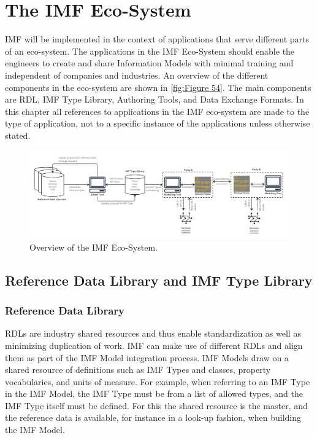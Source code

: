 \chapter{The IMF Eco-System }
\label{ch:Chapter 7}
IMF will be implemented in the context of applications that serve
different parts of an eco-system. The applications in the IMF Eco-System should enable the engineers to create and
share Information Models with minimal training and independent of companies and industries. An overview of the
different components in the eco-system are shown in \autoref{fig:Figure 54}. The main components are RDL, IMF Type Library,
Authoring Tools, and Data Exchange Formats. In this chapter all references to applications in the IMF eco-system are
made to the type of application, not to a specific instance of the applications unless otherwise stated.


\begin{figure}[htb]
  \includegraphics[width=1\textwidth]{img/IMFmanual-img072.jpg}
  \caption{Overview of the IMF Eco-System.}
  \label{fig:Figure 54}
\end{figure}

\section{Reference Data Library and IMF Type Library}
\subsection{Reference Data Library}
RDLs are industry shared resources and thus enable standardization as well as minimizing
duplication of work. IMF can make use of different RDLs and align them as part of the IMF Model integration process.
IMF Models draw on a shared resource of definitions such as IMF Types and classes, property vocabularies, and units
of measure. For example, when referring to an IMF Type in the IMF Model, the IMF Type must be from a list of allowed
types, and the IMF Type itself must be defined. For this the shared resource is the master, and the reference data is
available, for instance in a look-up fashion, when building the IMF Model.

